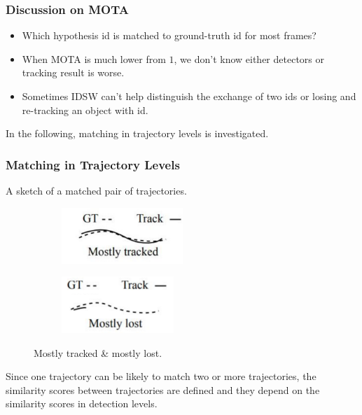 \documentclass[slidetop, mathserif]{beamer}
\begin{document}
\begin{frame}
	\frametitle{Discussion on MOTA}

	\begin{itemize}
	\item Which hypothesis id is matched to ground-truth id for most frames?
	\item When MOTA is much lower from $1$, we don't know either detectors or tracking result is worse.
	\item Sometimes IDSW can't help distinguish the exchange of two ids or
		losing and re-tracking an object with id.
	\end{itemize}

	In the following, matching in trajectory levels is investigated.

\end{frame}


\begin{frame}
	\frametitle{Matching in Trajectory Levels}

	A sketch of a matched pair of trajectories.
	\begin{figure}
		\begin{subfigure}{.5\textwidth}
			\centering
			\includegraphics[width=130pt]{pics/fig4.png}
		\end{subfigure}%
		\begin{subfigure}{.5\textwidth}
			\centering
			\includegraphics[width=120pt]{pics/fig5.png}
		\end{subfigure}
		\caption{Mostly tracked \& mostly lost.}
	\end{figure}

	Since one trajectory can be likely to match two or more trajectories,
	the similarity scores between trajectories are defined
	and they depend on the similarity scores in detection levels.
			
\end{frame}
\end{document}
